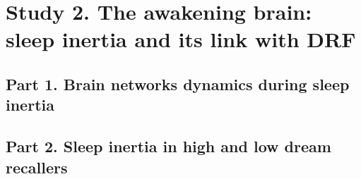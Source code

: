 \cleardoublepage

\chapter{Study 2. The awakening brain: sleep inertia and its link with DRF}
\label{res:inertia}

\section{Part 1. Brain networks dynamics during sleep inertia}
\label{res:inertia:inertia}

\cleardoublepage

\section{Part 2. Sleep inertia in high and low dream recallers}
\label{res:inertia:drf}
